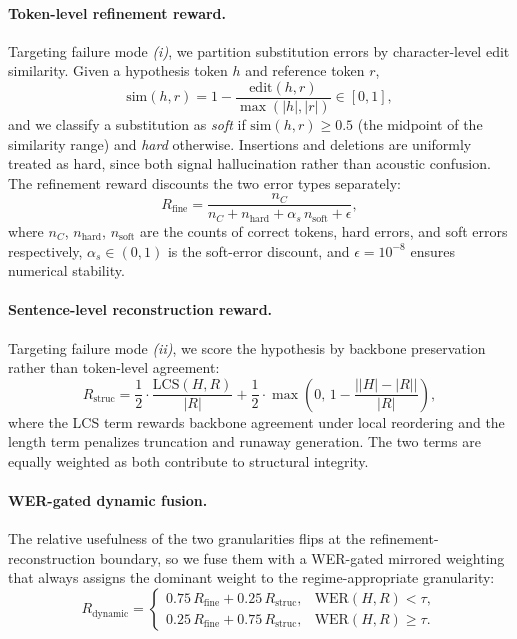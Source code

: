 \documentclass{llmxive}
\begin{document}
\vspace{-1mm}
\paragraph{Token-level refinement reward.} Targeting failure mode \textit{(i)}, we partition substitution errors by character-level edit similarity. Given a hypothesis token $h$ and reference token $r$,
\begin{equation}
\text{sim}(h,r) = 1 - \frac{\text{edit}(h,r)}{\max(|h|,|r|)} \in [0,1],
\end{equation}
and we classify a substitution as \textit{soft} if $\text{sim}(h,r) \geq 0.5$ (the midpoint of the similarity range) and \textit{hard} otherwise. Insertions and deletions are uniformly treated as hard, since both signal hallucination rather than acoustic confusion. The refinement reward discounts the two error types separately:
\begin{equation}
R_\text{fine} = \frac{n_C}{n_C + n_\text{hard} + \alpha_s\, n_\text{soft} + \epsilon},
\end{equation}
where $n_C$, $n_\text{hard}$, $n_\text{soft}$ are the counts of correct tokens, hard errors, and soft errors respectively, $\alpha_s \in (0,1)$ is the soft-error discount, and $\epsilon = 10^{-8}$ ensures numerical stability.

\vspace{-1mm}
\paragraph{Sentence-level reconstruction reward.} Targeting failure mode \textit{(ii)}, we score the hypothesis by backbone preservation rather than token-level agreement:
\begin{equation}
R_\text{struc} = \frac{1}{2} \cdot \frac{\text{LCS}(H,R)}{|R|} + \frac{1}{2} \cdot \max\!\left(0,\, 1 - \frac{\big||H|-|R|\big|}{|R|}\right),
\end{equation}
where the LCS term rewards backbone agreement under local reordering and the length term penalizes truncation and runaway generation. The two terms are equally weighted as both contribute to structural integrity.

\vspace{-1mm}
\paragraph{WER-gated dynamic fusion.} The relative usefulness of the two granularities flips at the refinement-reconstruction boundary, so we fuse them with a WER-gated mirrored weighting that always assigns the dominant weight to the regime-appropriate granularity:
\begin{equation}
R_\text{dynamic} =
\begin{cases}
0.75\, R_\text{fine} + 0.25\, R_\text{struc}, & \text{WER}(H,R) < \tau, \\[2pt]
0.25\, R_\text{fine} + 0.75\, R_\text{struc}, & \text{WER}(H,R) \geq \tau.
\end{cases}
\end{equation}
\end{document}
